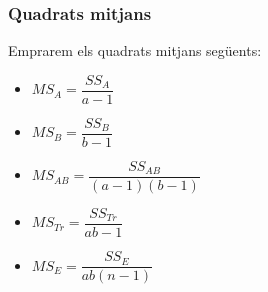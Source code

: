 \documentclass[12pt,t]{beamer}
\theoremstyle{plain}
\theoremstyle{definition}
\begin{document}
%
%
%
%
%
%   
%
%
%


\begin{frame}
\frametitle{Quadrats mitjans}
Emprarem els quadrats mitjans següents:
\begin{itemize}
\item  $MS_A =\dfrac{SS_A}{a-1}$ 
\medskip

\item  $MS_B =\dfrac{SS_B}{b-1}$
\medskip

\item $MS_{AB}=\dfrac{SS_{AB}}{(a-1)(b-1)}$
\medskip

\item $MS_{Tr}=\dfrac{SS_{Tr}}{ab-1}$
\medskip

\item $MS_E=\dfrac{SS_E}{ab (n-1)}$

\end{itemize}
\end{frame}
\end{document}
